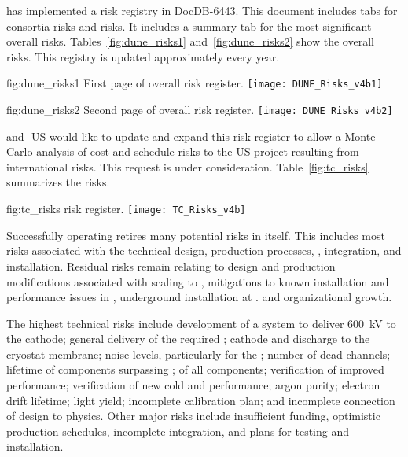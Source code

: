  has implemented a risk registry in
DocDB-6443. This document includes tabs for consortia risks
and  risks. It includes a summary tab for the most significant overall
 risks. Tables~\ref{fig:dune_risks1} and~\ref{fig:dune_risks2} show the overall  risks. This registry
is updated approximately every year.
\begin{dunefigure}{fig:dune_risks1}
  {First page of  overall risk register.}
  \texttt{[image: DUNE\_Risks\_v4b1]}
\end{dunefigure}
\begin{dunefigure}{fig:dune_risks2}
  {Second page of  overall risk register.}
  \texttt{[image: DUNE\_Risks\_v4b2]}
\end{dunefigure}
 and -US would like  to update and
expand this risk register to allow a Monte Carlo analysis of cost and
schedule risks to the US  project resulting from international
 risks. This request is under consideration.
Table~\ref{fig:tc_risks} summarizes the  risks.
\begin{dunefigure}{fig:tc_risks}
  { risk register.}
  \texttt{[image: TC\_Risks\_v4b]}
\end{dunefigure}



Successfully operating  retires many
potential risks in  itself. This includes most risks associated with the
technical design, production processes, , integration,
and installation. Residual risks remain relating to design and
production modifications associated with scaling to , mitigations
to known installation and performance issues in , underground
installation at \surf. and organizational growth.

The highest technical risks include development of a system to
deliver \SI{600}{kV} to the \dual cathode; general delivery of the
required ; cathode and  discharge to the cryostat
membrane; noise levels, particularly for the ; %
number of dead channels; lifetime of components surpassing \dunelifetime{}; %
 of all components; verification of improved 
performance; verification of new cold   and   performance;
argon purity; electron drift lifetime; \phel light yield;
incomplete calibration plan; and incomplete connection of design to
physics. Other major risks include insufficient funding, optimistic
production schedules, incomplete integration, and plans for testing and installation.

